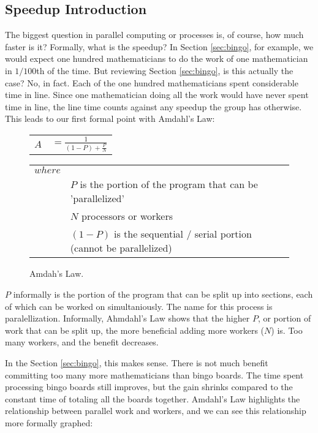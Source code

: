 \subsection{Speedup Introduction}
The biggest question in parallel computing or processes is, of course, how much faster is it? Formally, what is the \gls{speedup}? 
In Section \ref{sec:bingo}, for example, we would expect one hundred mathematicians to do the work of one 
mathematician in $1/100$th of the time. But reviewing Section \ref{sec:bingo}, is this actually the case? No,
in fact. Each of the one hundred mathematicians spent considerable time in line. Since one mathematician
doing all the work would have never spent time in line, the line time counts against any speedup the group
has otherwise. This leads to our first formal point with Amdahl's Law:

\begin{figure}[h]
	\begin{center}
		\LARGE
		\begin{tabular}{l r}
			$ A $		&	$ = \frac{1}{(1 - P) + \frac{P}{N}} $ \\
		\end{tabular}

		\normalsize
		\begin{tabular}{l l}
			$ where $  & \\
					&	$ P $ is the portion of the program that can be 'parallelized' \\
					&	$ N $ processors or workers \\
					&	$ (1 - P) $ is the sequential / serial portion (cannot be parallelized) \\
		\end{tabular}
		\caption{Amdah's Law. \cite{amdahl}} 
		\label{amdahl}
	\end{center}
\end{figure}
\normalsize

$ P $ informally is the portion of the program that can be split up into sections, each of which can be worked 
on simultaniously. The name for this process is \gls{paralellization}. Informally, Ahmdahl's Law shows that 
the higher $ P $, or portion of work that can be split up, the more beneficial adding more workers ($ N $) is. Too many workers, and the benefit decreases.

In the Section \ref{sec:bingo}, this makes sense. There is not much benefit committing too many more
mathematicians than bingo boards. The time spent processing bingo boards still improves, but the gain
shrinks compared to the constant time of totaling all the boards together. Amdahl's Law highlights the 
relationship between parallel work and workers, and we can see this relationship more formally graphed:


